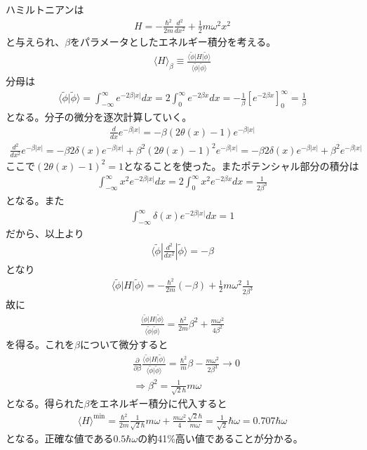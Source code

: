\documentclass{jlreq}
\begin{document}
ハミルトニアンは
\begin{align}
    H=-\frac{\hbar^2}{2m}\frac{d^2}{dx^2}+\frac{1}{2}m\omega^2x^2
\end{align}
と与えられ、$\beta$をパラメータとしたエネルギー積分を考える。
\begin{align}
    \langle H\rangle_\beta\equiv\frac{\langle\tilde{\phi}|H|\tilde{\phi}\rangle}{\langle\tilde{\phi}|\tilde{\phi}\rangle}
\end{align}
分母は
\begin{align}
    \langle\tilde{\phi}|\tilde{\phi}\rangle=\int^\infty_{-\infty}e^{-2\beta|x|} dx=2\int^\infty_{0}e^{-2\beta x} dx = -\frac{1}{\beta}[e^{-2\beta x}]^\infty_0=\frac{1}{\beta}
\end{align}
となる。分子の微分を逐次計算していく。
\begin{align}
    \frac{d}{dx}e^{-\beta |x|}=-\beta (2\theta(x)-1)e^{-\beta |x|}
\end{align}
\begin{align}
    \frac{d^2}{dx^2}e^{-\beta |x|}=-\beta 2\delta(x)e^{-\beta |x|}+\beta^2 (2\theta(x)-1)^2 e^{-\beta |x|}=-\beta 2\delta(x)e^{-\beta |x|}+\beta^2 e^{-\beta |x|}
\end{align} 
ここで$(2\theta(x)-1)^2=1$となることを使った。またポテンシャル部分の積分は
\begin{align}
    \int^\infty_{-\infty} x^2 e^{-2\beta|x|}dx=2\int^{\infty}_0 x^2 e^{-2\beta x}dx=\frac{1}{2\beta^3}
\end{align}
となる。また
\begin{align}
    \int^\infty_{-\infty} \delta(x) e^{-2\beta|x|}dx=1
\end{align}
だから、以上より
\begin{align}
    \langle\tilde{\phi}|\frac{d^2}{dx^2}|\tilde{\phi}\rangle=-\beta
\end{align}
となり
\begin{align}
    \langle\tilde{\phi}|H|\tilde{\phi}\rangle=-\frac{\hbar^2}{2m}(-\beta)+\frac{1}{2}m\omega^2\frac{1}{2\beta^3}
\end{align}
故に
\begin{align}
    \frac{\langle\tilde{\phi}|H|\tilde{\phi}\rangle}{\langle\tilde{\phi}|\tilde{\phi}\rangle}=\frac{\hbar^2}{2m}\beta^2+\frac{m\omega^2}{4\beta^2}
\end{align}
を得る。これを$\beta$について微分すると
\begin{align}
    &\frac{\partial}{\partial\beta}\frac{\langle\tilde{\phi}|H|\tilde{\phi}\rangle}{\langle\tilde{\phi}|\tilde{\phi}\rangle}=\frac{\hbar^2}{m}\beta-\frac{m\omega^2}{2\beta^3}\rightarrow 0 \\
    &\Rightarrow \beta^2=\frac{1}{\sqrt{2}\hbar}m\omega
\end{align}
となる。得られた$\beta$をエネルギー積分に代入すると
\begin{align}
    \langle H\rangle^\text{min}=\frac{\hbar^2}{2m}\frac{1}{\sqrt{2}\hbar}m\omega+\frac{m\omega^2}{4} \frac{\sqrt{2}\hbar}{m\omega}=\frac{1}{\sqrt{2}}\hbar\omega=0.707\hbar\omega
\end{align}
となる。正確な値である$0.5\hbar\omega$の約41\%高い値であることが分かる。
\end{document}
